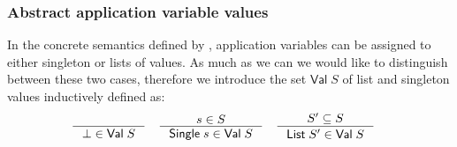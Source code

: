 \subsubsection{Abstract application variable values}
In the concrete semantics defined by \cite{halder_abstract_2012}, application variables can be assigned to either singleton or lists of values.
As much as we can we would like to distinguish between these two cases, therefore we introduce the set $\mathsf{Val} \; S$ of list and singleton values inductively defined as:
\begin{align}
    \inference{}{\bot \in \mathsf{Val} \; S} \quad
    \inference{s \in S}{\mathsf{Single} \; s \in \mathsf{Val} \; S} \quad
    \inference{S' \subseteq S}{\mathsf{List} \; S' \in \mathsf{Val} \; S} \quad
\end{align}

